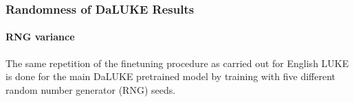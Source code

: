 \documentclass[main.tex]{subfiles}
\begin{document}
\subsubsection{Randomness of DaLUKE Results}
\paragraph{RNG variance}

The same repetition of the finetuning procedure as carried out for English LUKE is done for the main DaLUKE pretrained model by training with five different random number generator (RNG) seeds.










\end{document}
